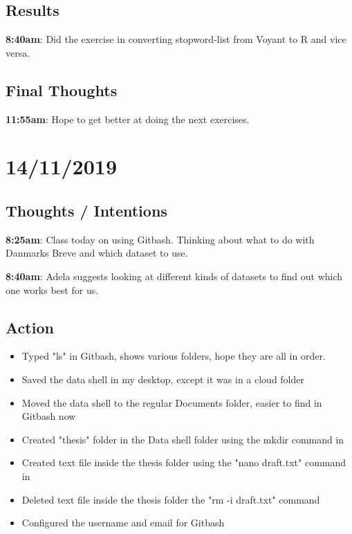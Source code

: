 \documentclass{article}
\begin{document}
\subsection{Results}

\textbf{8:40am}: Did the exercise in converting stopword-list from Voyant to R and vice versa.

\subsection{Final Thoughts}

\textbf{11:55am}: Hope to get better at doing the next exercises.

\section{14/11/2019}

\subsection{Thoughts / Intentions}

\textbf{8:25am}: Class today on using Gitbash. Thinking about what to do with Danmarks Breve and which dataset to use.

\textbf{8:40am}: Adela suggests looking at different kinds of datasets to find out which one works best for us.

\subsection{Action}

\begin{itemize}
    \item Typed "ls" in Gitbash, shows various folders, hope they are all in order.
    \item Saved the data shell in my desktop, except it was in a cloud folder
    \item Moved the data shell to the regular Documents folder, easier to find in Gitbash now
    \item Created "thesis" folder in the Data shell folder using the mkdir command in
    \item Created text file inside the thesis folder using the "nano draft.txt" command in
    \item Deleted text file inside the thesis folder the "rm -i draft.txt" command
    \item Configured the username and email for Gitbash
\end{itemize}
\end{document}
